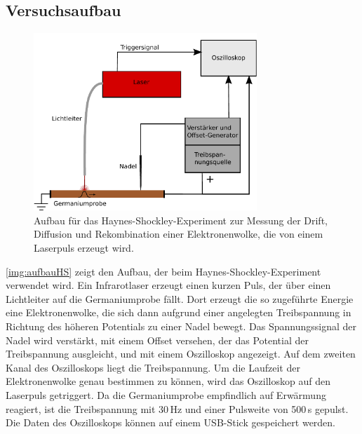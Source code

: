 \subsection{Versuchsaufbau}

\begin{figure}[H]
\begin{center}
  \includegraphics[width=0.75\textwidth]{../img/aufbauHS.pdf}
  \caption{Aufbau für das Haynes-Shockley-Experiment zur Messung der Drift, Diffusion und Rekombination einer
  Elektronenwolke, die von einem Laserpuls erzeugt wird.}
  \label{img:aufbauHS}
\end{center}
\end{figure}

\autoref{img:aufbauHS} zeigt den Aufbau, der beim Haynes-Shockley-Experiment verwendet wird.
Ein Infrarotlaser erzeugt einen kurzen Puls, der über einen Lichtleiter auf die Germaniumprobe fällt.
Dort erzeugt die so zugeführte Energie eine Elektronenwolke,
die sich dann aufgrund einer angelegten Treibspannung in Richtung des höheren Potentials zu einer Nadel bewegt.
Das Spannungssignal der Nadel wird verstärkt,
mit einem Offset versehen, der das Potential der Treibspannung ausgleicht,
und mit einem Oszilloskop angezeigt.
Auf dem zweiten Kanal des Oszilloskops liegt die Treibspannung.
Um die Laufzeit der Elektronenwolke genau bestimmen zu können,
wird das Oszilloskop auf den Laserpuls getriggert.
Da die Germaniumprobe empfindlich auf Erwärmung reagiert,
ist die Treibspannung mit 30\,Hz und einer Pulsweite von 500\,\textmu s gepulst. 
Die Daten des Oszilloskops können auf einem USB-Stick gespeichert werden.